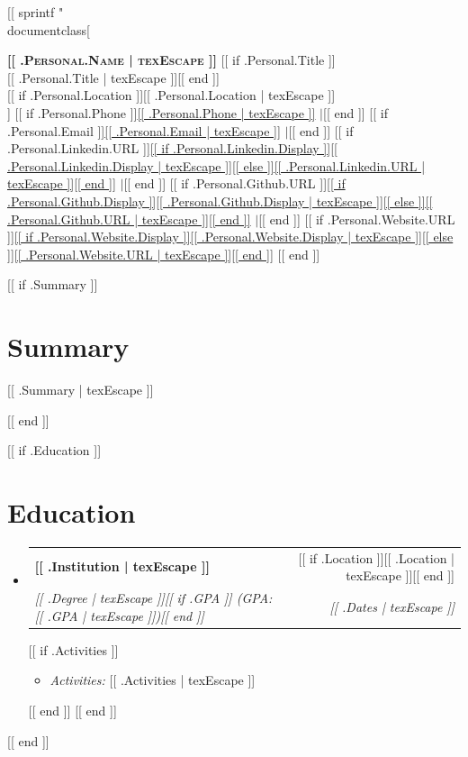 [[ sprintf "\\documentclass[%
\makeatletter
\newcommand{\resumeItem}[1]{
  \item\small{
    {#1 \vspace{-2pt}}
  }
}
\newcommand{\resumeSubheading}[4]{
  \vspace{-1pt}\item
    \begin{tabular*}{0.97\textwidth}[t]{l@{\extracolsep{\fill}}r}
      \textbf{#1} & #2 \\
      \textit{\small#3} & \textit{\small #4} \\
    \end{tabular*}\vspace{-7pt}
}
\newcommand{\resumeSubHeadingListStart}{\begin{itemize}[leftmargin=0.15in, label={}]}
\newcommand{\resumeSubHeadingListEnd}{\end{itemize}}
\newcommand{\resumeItemListStart}{\begin{itemize}}
\newcommand{\resumeItemListEnd}{\end{itemize}\vspace{-5pt}}
\makeatother
\begin{document}

\begin{center}
    \textbf{\Huge \scshape [[ .Personal.Name | texEscape ]]} [[ if .Personal.Title ]]\\ \vspace{1pt} {\large [[ .Personal.Title | texEscape ]]}[[ end ]] \\ \vspace{1pt}
    [[ if .Personal.Location ]]\small [[ .Personal.Location | texEscape ]] \\[[ end ]]
    \small
    [[ if .Personal.Phone ]]\href{tel:[[ .Personal.Phone | texEscape ]]}{[[ .Personal.Phone | texEscape ]]} $|$[[ end ]]
    [[ if .Personal.Email ]]\href{mailto:[[ .Personal.Email | texEscape ]]}{[[ .Personal.Email | texEscape ]]} $|$[[ end ]]
    [[ if .Personal.Linkedin.URL ]]\href{[[ .Personal.Linkedin.URL | texEscape ]]}{[[ if .Personal.Linkedin.Display ]][[ .Personal.Linkedin.Display | texEscape ]][[ else ]][[ .Personal.Linkedin.URL | texEscape ]][[ end ]]} $|$[[ end ]]
    [[ if .Personal.Github.URL ]]\href{[[ .Personal.Github.URL | texEscape ]]}{[[ if .Personal.Github.Display ]][[ .Personal.Github.Display | texEscape ]][[ else ]][[ .Personal.Github.URL | texEscape ]][[ end ]]} $|$[[ end ]]
    [[ if .Personal.Website.URL ]]\href{[[ .Personal.Website.URL | texEscape ]]}{[[ if .Personal.Website.Display ]][[ .Personal.Website.Display | texEscape ]][[ else ]][[ .Personal.Website.URL | texEscape ]][[ end ]]} [[ end ]]
\end{center}


[[ if .Summary ]]
\section{Summary}
\begin{itemize}[leftmargin=0.15in, label={}]
    \small{\item{
    [[ .Summary | texEscape ]]
    }}
\end{itemize}
[[ end ]]

[[ if .Education ]]
\section{Education}
  \resumeSubHeadingListStart
    [[ range .Education ]]
    \resumeSubheading
      {[[ .Institution | texEscape ]]}{[[ if .Location ]][[ .Location | texEscape ]][[ end ]]}
      {[[ .Degree | texEscape ]][[ if .GPA ]] (GPA: [[ .GPA | texEscape ]])[[ end ]]}{[[ .Dates | texEscape ]]}
      [[ if .Activities ]]
      \resumeItemListStart
        \resumeItem{\textit{Activities:} [[ .Activities | texEscape ]]}
      \resumeItemListEnd
      [[ end ]]
    [[ end ]]
  \resumeSubHeadingListEnd
[[ end ]]
\end{document}
